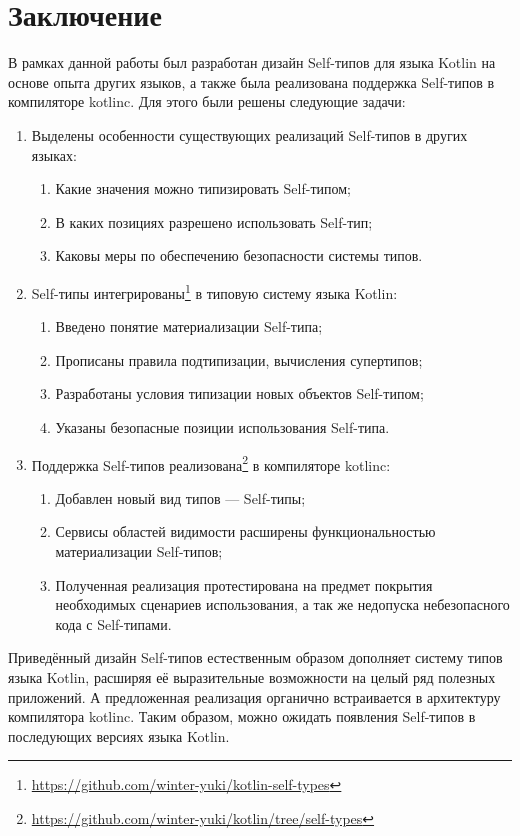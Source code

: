\section*{Заключение}

В рамках данной работы был разработан дизайн Self-типов для языка Kotlin на основе опыта других языков, а также была реализована поддержка Self-типов в компиляторе kotlinc.
Для этого были решены следующие задачи:
\begin{enumerate}
    \item Выделены особенности существующих реализаций Self-типов в других языках:
    \begin{enumerate}
        \item Какие значения можно типизировать Self-типом;
        \item В каких позициях разрешено использовать Self-тип;
        \item Каковы меры по обеспечению безопасности системы типов.
    \end{enumerate}
    \item Self-типы интегрированы\footnote{\url{https://github.com/winter-yuki/kotlin-self-types}} в типовую систему языка Kotlin:
    \begin{enumerate}
        \item Введено понятие материализации Self-типа;
        \item Прописаны правила подтипизации, вычисления супертипов;
        \item Разработаны условия типизации новых объектов Self-типом;
        \item Указаны безопасные позиции использования Self-типа.
    \end{enumerate}
    \item Поддержка Self-типов реализована\footnote{\url{https://github.com/winter-yuki/kotlin/tree/self-types}} в компиляторе kotlinc:
    \begin{enumerate}
        \item Добавлен новый вид типов --- Self-типы;
        \item Сервисы областей видимости расширены функциональностью материализации Self-типов;
        \item Полученная реализация протестирована на предмет покрытия необходимых сценариев использования, а так же недопуска небезопасного кода с Self-типами.
    \end{enumerate}
\end{enumerate}

Приведённый дизайн Self-типов естественным образом дополняет систему типов языка Kotlin, расширяя её выразительные возможности на целый ряд полезных приложений.
А предложенная реализация органично встраивается в архитектуру компилятора kotlinc.
Таким образом, можно ожидать появления Self-типов в последующих версиях языка Kotlin.
